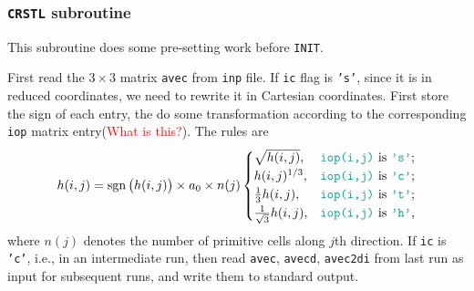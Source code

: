 
\subsubsection{\texttt{CRSTL} subroutine}
\label{sssec:crstl}

This subroutine does some pre-setting work before \texttt{INIT}.

First read the $3 \times 3$ matrix \texttt{avec} from \texttt{inp} file.
If \texttt{ic} flag is \texttt{'s'},
since it is in reduced coordinates, we need to rewrite it in Cartesian
coordinates. First store the sign of each entry, the do some transformation according to
the corresponding \texttt{iop} matrix entry(\textcolor{red}{What is this?}). The
rules are
\begin{equation}\label{eq:crstltrans}
	h(i, j) = \sign \big( h(i, j) \big) \times a_0 \times n(j)
	\begin{cases}
		\sqrt{h(i, j)},                 & \text{\texttt{iop(i,j)} is \texttt{'s'};} \\
		h(i, j)^{1/3},                  & \text{\texttt{iop(i,j)} is \texttt{'c'};} \\
		\frac{ 1 }{ 3 } h(i, j),        & \text{\texttt{iop(i,j)} is \texttt{'t'};} \\
		\frac{ 1 }{ \sqrt{3} } h(i, j), & \text{\texttt{iop(i,j)} is \texttt{'h'},} 
	\end{cases}
\end{equation}
where $n(j)$ denotes the number of primitive cells along $j$th direction.
If \texttt{ic} is \texttt{'c'}, i.e., in an intermediate run,
then read \texttt{avec}, \texttt{avecd}, \texttt{avec2di} from last run as
input for subsequent runs, and write them to standard output.

